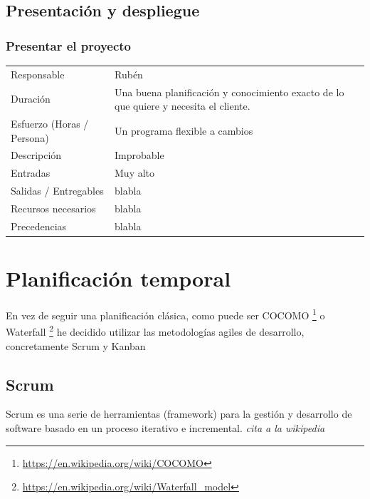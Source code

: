 \subsection{Presentaci\'{o}n y despliegue}
\subsubsection{Presentar el proyecto}
\begin{table}[H]
    \begin{center}
        \begin{tabular}{l p{8cm}}
            Responsable                           & Rub\'{e}n \\
            Duraci\'{o}n                          & Una buena planificación y conocimiento exacto de lo que quiere y necesita el cliente. \\ 
            Esfuerzo (Horas / Persona)            & Un programa flexible a cambios \\
            Descripci\'{o}n                       & Improbable \\
            Entradas                              & Muy alto\\
            Salidas / Entregables                 & blabla \\
            Recursos necesarios                   & blabla \\
            Precedencias                          & blabla \\
        \end{tabular}
    \end{center}
    
\end{table}


\section{Planificaci\'{o}n temporal}
En vez de seguir una planificación clásica, como puede ser COCOMO \footnote{\url{https://en.wikipedia.org/wiki/COCOMO}} o Waterfall \footnote{\url{https://en.wikipedia.org/wiki/Waterfall_model}} he decidido utilizar las metodologías agiles de desarrollo, concretamente Scrum y Kanban

\subsection{Scrum}
Scrum es una serie de herramientas (framework) para la gestión y desarrollo de software basado en un proceso iterativo e incremental. \emph{cita a la wikipedia}

